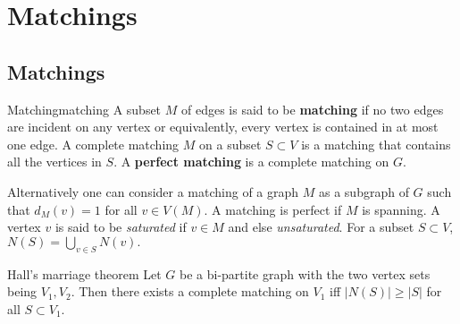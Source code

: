 \documentclass[../basic_graph_theory.tex]{subfiles}
\begin{document}
\chapter{Matchings}
\setcounter{chapter}{5} %
\setcounter{section}{0}
\setcounter{equation}{0}
\setcounter{figure}{0}

\section{Matchings}

\begin{Def}{Matching}{matching}
    A subset $M$ of edges is said to be \textbf{matching} if no two edges are incident on any vertex or equivalently, every vertex is contained in at most one edge. A {complete matching} $M$ on a subset $S \subset V$ is a matching that contains all the vertices in $S$. A \textbf{perfect matching} is a complete matching on $G$.
\end{Def}

Alternatively one can consider a matching of a graph $M$ as a subgraph of $G$ such that $d_M(v) = 1$ for all $v \in V(M)$. A matching is perfect if $M$ is spanning. A vertex $v$ is said to be {\em saturated} if $v \in M$ and else {\em unsaturated}. For a subset $S \subset V$, $N(S) = \bigcup_{v \in S}N(v).$

\begin{Thm}{Hall's marriage theorem}{}
    Let $G$ be a bi-partite graph with the two vertex sets being $V_1,V_2$.  Then there exists a complete matching on $V_1$ iff $|N(S)| \geq |S|$ for all $S \subset V_1$.
\end{Thm}
\end{document}

